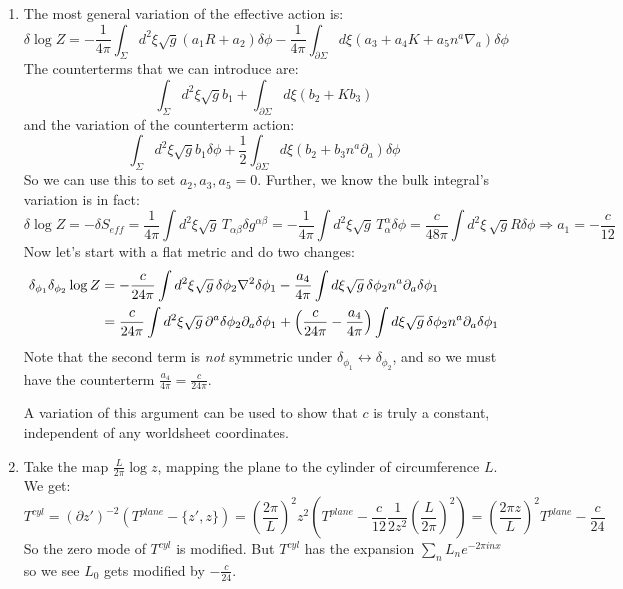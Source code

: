 \documentclass[11pt]{article}
\begin{document}
\begin{enumerate}
	\item The most general variation of the effective action is:
	\begin{equation}
		\delta \log Z = - \frac{1}{4\pi} \int_{\Sigma} d^2 \xi \sqrt{g} (a_1 R + a_2) \delta \phi - \frac{1}{4\pi} \int_{\partial \Sigma} d \xi (a_3 + a_4 K + a_5 n^a \nabla_a) \delta \phi
	\end{equation}
	The counterterms that we can introduce are:
	\begin{equation}
		\int_\Sigma d^2 \xi \sqrt g b_1 + \int_{\partial \Sigma} d \xi (b_2 + K b_3)
	\end{equation}
	and the variation of the counterterm action: 
	\[
		\int_\Sigma d^2 \xi \sqrt g b_1 \delta \phi + \frac12 \int_{\partial \Sigma} d \xi (b_2 + b_3 n^a \partial_a) \delta \phi
	\]
	So we can use this to set $a_2, a_3, a_5 = 0$. Further, we know the bulk integral's variation is in fact:
	\[
		\delta \log Z = - \delta S_{eff} = \frac{1}{4\pi} \int d^2 \xi \sqrt g \, T_{\alpha \beta} \delta g^{\alpha \beta} = - \frac{1}{4\pi} \int d^2 \xi \sqrt g \, T^\alpha_\alpha \delta \phi = \frac{c}{48\pi} \int d^2 \xi \, \sqrt g R \delta \phi \Rightarrow a_1 = - \frac{c}{12}
	\]
	Now let's start with a flat metric and do two changes:
	\[
	\begin{aligned}
		\delta_{\phi_1} \delta_{\phi_2} \log Z &= -\frac{c}{24\pi} \int d^2 \xi \sqrt g\, \delta \phi_2 \nabla^2 \delta \phi_1 - \frac{a_4}{4\pi} \int d\xi \sqrt g\,  \delta \phi_2 n^a \partial_a \delta \phi_1\\ &= \frac{c}{24\pi} \int d^2 \xi \sqrt g\, \partial^a \delta \phi_2 \partial_a \delta \phi_1 + \left(\frac{c}{24\pi} - \frac{a_4}{4\pi}\right) \int d\xi \sqrt g\,  \delta \phi_2 n^a \partial_a \delta \phi_1
	\end{aligned}
	\]
	Note that the second term is \emph{not} symmetric under $\delta_{\phi_1} \leftrightarrow \delta_{\phi_2}$, and so we must have the counterterm $\frac{a_4}{4\pi} = \frac{c}{24\pi}$.
	
	A variation of this argument can be used to show that $c$ is truly a constant, independent of any worldsheet coordinates. 
	
	\item Take the map $\frac{L}{2\pi} \log z$, mapping the plane to the cylinder of circumference $L$. We get:
	\[
		T^{cyl} = (\partial z')^{-2} (T^{plane} - \{z', z\}) = \left( \frac{2\pi}{L}\right)^2 z^2 \left(T^{plane} - \frac{c}{12} \frac{1}{2 z^2} \left(\frac{L}{2\pi} \right)^2 \right) = \left(\frac{2\pi z}{L}\right)^2 T^{plane} - \frac{c}{24}
	\]	
	So the zero mode of $T^{cyl}$ is modified. But $T^{cyl}$ has the expansion $\sum_n L_n e^{-2 \pi i n x}$ so we see $L_0$ gets modified by $-\frac{c}{24}$.
	

\end{enumerate}
\end{document}
